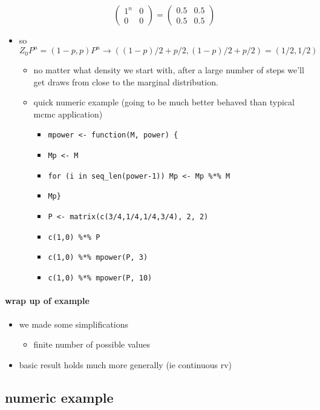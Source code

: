 \begin{itemize}
\[\begin{pmatrix}
        1^n & 0 \\ 0 & 0 \end{pmatrix} = \begin{pmatrix} 0.5 & 0.5
        \\ 0.5 & 0.5 \end{pmatrix}\]
\item so $Z_0 P^n = (1-p, p) P^n \to ((1-p)/2 + p/2, (1-p)/2 +
        p/2) = (1/2, 1/2)$
\begin{itemize}
\item no matter what density we start with, after a large number
          of steps we'll get draws from close to the marginal
          distribution.
\item quick numeric example (going to be much better behaved than
          typical mcmc application)
\begin{itemize}
\item \texttt{mpower <- function(M, power) \{}
\item \texttt{Mp <- M}
\item \texttt{for (i in seq\_len(power-1)) Mp <- Mp \%*\% M}
\item \texttt{Mp\}}
\item \texttt{P <- matrix(c(3/4,1/4,1/4,3/4), 2, 2)}
\item \texttt{c(1,0) \%*\% P}
\item \texttt{c(1,0) \%*\% mpower(P, 3)}
\item \texttt{c(1,0) \%*\% mpower(P, 10)}
\end{itemize}
\end{itemize}
\end{itemize}
\paragraph{wrap up of example}
\label{sec-3-2-3}

\begin{itemize}
\item we made some simplifications
\begin{itemize}
\item finite number of possible values
\end{itemize}
\item basic result holds much more generally (ie continuous rv)
\end{itemize}
\subsection{numeric example}
\label{sec-3-3}

